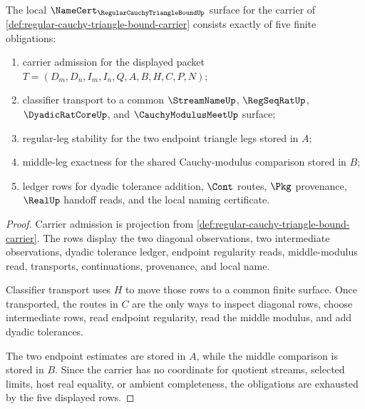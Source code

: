 \begin{theorem}
\label{thm:regular-cauchy-triangle-bound-namecert-obligations}
The local $\NameCert_{\RegularCauchyTriangleBoundUp}$ surface for the carrier of \autoref{def:regular-cauchy-triangle-bound-carrier} consists exactly of five finite obligations:
\begin{enumerate}
\item carrier admission for the displayed packet $T=(D_m,D_n,I_m,I_n,Q,A,B,H,C,P,N)$;
\item classifier transport to a common $\StreamNameUp$, $\RegSeqRatUp$, $\DyadicRatCoreUp$, and $\CauchyModulusMeetUp$ surface;
\item regular-leg stability for the two endpoint triangle legs stored in $A$;
\item middle-leg exactness for the shared Cauchy-modulus comparison stored in $B$;
\item ledger rows for dyadic tolerance addition, $\Cont$ routes, $\Pkg$ provenance, $\RealUp$ handoff reads, and the local naming certificate.
\end{enumerate}
\end{theorem}
\begin{proof}
Carrier admission is projection from \autoref{def:regular-cauchy-triangle-bound-carrier}. The rows display the two diagonal observations, two intermediate observations, dyadic tolerance ledger, endpoint regularity reads, middle-modulus read, transports, continuations, provenance, and local name.

Classifier transport uses $H$ to move those rows to a common finite surface. Once transported, the routes in $C$ are the only ways to inspect diagonal rows, choose intermediate rows, read endpoint regularity, read the middle modulus, and add dyadic tolerances.

The two endpoint estimates are stored in $A$, while the middle comparison is stored in $B$. Since the carrier has no coordinate for quotient streams, selected limits, host real equality, or ambient completeness, the obligations are exhausted by the five displayed rows.
\end{proof}

